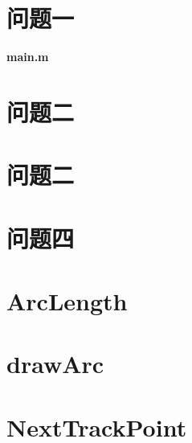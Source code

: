 \documentclass{article}
\begin{document}
\section*{}
\begin{appendices}
    \section{问题一}
    \noindent \textcolor[rgb]{0,0,0}{\textbf{main.m}}
    
    \section{问题二}
    
    \section{问题二}
    
    
    
    \section{问题四}
    
    
    
    
    \section{ArcLength}
    
    \section{drawArc}
    
    \section{NextTrackPoint}
    
\end{appendices}
\end{document}
